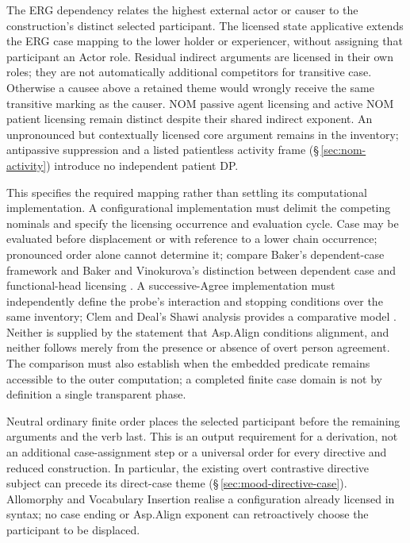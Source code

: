 The ERG dependency relates the highest external actor or causer to the
construction's distinct selected participant. The licensed state applicative
extends the ERG case mapping to the lower holder or experiencer, without
assigning that participant an Actor role. Residual indirect arguments are
licensed in their own roles; they are not automatically additional competitors
for transitive case. Otherwise a causee above a retained theme would wrongly
receive the same transitive marking as the causer. NOM passive agent licensing
and active NOM patient licensing remain distinct despite their shared indirect
exponent. An unpronounced but contextually licensed core argument remains in
the inventory; antipassive suppression and a listed patientless activity
frame (§\,\ref{sec:nom-activity}) introduce no independent patient DP.

This specifies the required mapping rather than settling its computational
implementation. A configurational implementation must delimit the competing
nominals and specify the licensing occurrence and evaluation cycle. Case may
be evaluated before displacement or with reference to a lower chain occurrence;
pronounced order alone cannot determine it; compare Baker's dependent-case framework and Baker and
Vinokurova's distinction between dependent case and functional-head licensing
\cite{baker2015,bakervinokurova2010}. A successive-Agree implementation must
independently define the probe's interaction and stopping conditions over the
same inventory; Clem and Deal's Shawi analysis provides a comparative model
\cite{clemdeal2026}. Neither
is supplied by the statement that Asp.Align conditions alignment, and neither
follows merely from the presence or absence of overt person agreement.
The comparison must also establish when the embedded predicate remains
accessible to the outer computation; a completed finite case domain is not
by definition a single transparent phase.

Neutral ordinary finite order places the selected participant before the
remaining arguments and the verb last. This is an output requirement for a
derivation, not an additional case-assignment step or a universal order for
every directive and reduced construction. In particular, the existing overt
contrastive directive subject can precede its direct-case theme
(§\,\ref{sec:mood-directive-case}). Allomorphy and Vocabulary Insertion
realise a configuration already licensed in syntax; no case ending or
Asp.Align exponent can retroactively choose the participant to be displaced.

